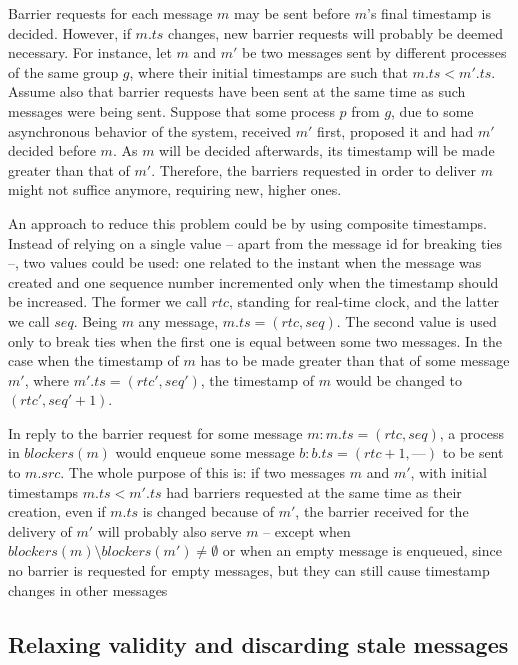 \documentclass[times, 10pt]{article}
\begin{document}
Barrier requests for each message $m$ may be sent before $m$'s final timestamp is decided. However, if $m.ts$ changes, new barrier requests will probably be deemed necessary. For instance, let $m$ and $m'$ be two messages sent by different processes of the same group $g$, where their initial timestamps are such that $m.ts < m'.ts$. Assume also that barrier requests have been sent at the same time as such messages were being sent. Suppose that some process $p$ from $g$, due to some asynchronous behavior of the system, received $m'$ first, proposed it and had $m'$ decided before $m$. As $m$ will be decided afterwards, its timestamp will be made greater than that of $m'$. Therefore, the barriers requested in order to deliver $m$ might not suffice anymore, requiring new, higher ones.

An approach to reduce this problem could be by using composite timestamps. Instead of relying on a single value -- apart from the message id for breaking ties --, two values could be used: one related to the instant when the message was created and one sequence number incremented only when the timestamp should be increased. The former we call $rtc$, standing for real-time clock, and the latter we call $seq$. Being $m$ any message, $m.ts = (rtc,seq)$. The second value is used only to break ties when the first one is equal between some two messages. In the case when the timestamp of $m$ has to be made greater than that of some message $m'$, where $m'.ts = (rtc', seq')$, the timestamp of $m$ would be changed to $(rtc', seq'+1)$.

In reply to the barrier request for some message $m : m.ts = (rtc,seq)$, a process in $blockers(m)$ would enqueue some message $b : b.ts = (rtc + 1, \text{---})$ to be sent to $m.src$. The whole purpose of this is: if two messages $m$ and $m'$, with initial timestamps $m.ts < m'.ts$ had barriers requested at the same time as their creation, even if $m.ts$ is changed because of $m'$, the barrier received for the delivery of $m'$ will probably also serve $m$ -- except when \mbox{$blockers(m) \setminus blockers(m') \neq \emptyset$} or when an empty message is enqueued, since no barrier is requested for empty messages, but they can still cause timestamp changes in other messages

\subsection{Relaxing validity and discarding stale messages}
\label{sec:discard}
\end{document}
